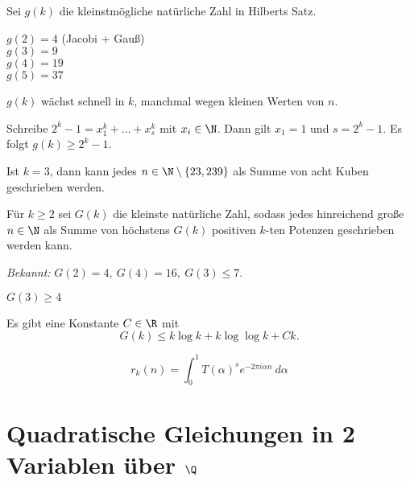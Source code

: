 \begin{defn*}
	Sei $g(k)$ die kleinstmögliche natürliche Zahl in Hilberts Satz.
\end{defn*}

\begin{exmp*}
	$g(2) = 4$ (Jacobi + Gauß)\\
	\( g(3) = 9 \)\\
	\( g(4) = 19 \)\\
	\( g(5) = 37 \)
\end{exmp*}

\begin{obs*}
	$g(k)$ wächst schnell in $k$, manchmal wegen kleinen Werten von $n$.
\end{obs*}

\begin{exmp*}
	Schreibe $2^k-1 = x_1^k + \dotsc + x_s^k$ mit $x_i \in \N$. Dann gilt $x_1 = 1$ und $s = 2^k-1$. Es folgt $g(k) \geq 2^k-1$.
\end{exmp*}

\begin{idee*}
	Ist $k = 3$, dann kann jedes $n \in \N \setminus \{23,239\}$ als Summe von acht Kuben geschrieben werden.
\end{idee*}

\begin{defn*}
	Für $k \geq 2$ sei $G(k)$ die kleinste natürliche Zahl, sodass jedes hinreichend große $n \in \N$ als Summe von höchstens $G(k)$ positiven $k$-ten Potenzen geschrieben werden kann.
\end{defn*}

\emph{Bekannt:} $G(2) = 4,\ G(4) = 16,\ G(3) \leq 7$.

\begin{lem}\autolabel
	$G(3) \geq 4$
\end{lem}

\begin{thm*}
	Es gibt eine Konstante $C \in \R$ mit
	\[ G(k) \leq k \log k + k \log\log k + Ck. \]
\end{thm*}

\begin{lem*}
	\[ r_k(n) = \int_{0}^{1} T(\alpha)^s e^{-2\pi i \alpha n} \ d\alpha\]
\end{lem*}

\section{Quadratische Gleichungen in 2 Variablen über $\Q$}

